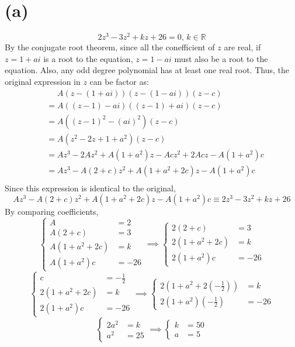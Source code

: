\documentclass[12pt,a4paper]{article}
\begin{document}
\section*{(a)}
\[2z^3-3z^2+kz+26=0,\,k\in\mathbb R\]
By the conjugate root theorem, since all the conefficient of \(z\) are real, if \(z=1+ai\) is a root to the equation, \(z=1-ai\) must also be a root to the equation. Also, any odd degree polynomial has at least one real root. Thus, the original expression in \(z\) can be factor as:
\[\begin{aligned}
	&\phantom=A(z-(1+ai))(z-(1-ai))(z-c)\\
	&=A((z-1)-ai)((z-1)+ai)(z-c)\\
	&=A\left((z-1)^2-(ai)^2\right)(z-c)\\
	&=A\left(z^2-2z+1+a^2\right)(z-c)\\
	&=Az^3-2Az^2+A\left(1+a^2\right)z-Acz^2+2Acz-A\left(1+a^2\right)c\\
	&=Az^3-A(2+c)z^2+A\left(1+a^2+2c\right)z-A\left(1+a^2\right)c\\
\end{aligned}\]
Since this expression is identical to the original,
\[Az^3-A(2+c)z^2+A\left(1+a^2+2c\right)z-A\left(1+a^2\right)c\equiv2z^3-3z^2+kz+26\]
By comparing coefficients, 
\[\begin{cases}
	A&=2\\
	A(2+c)&=3\\
	A\left(1+a^2+2c\right)&=k\\
	A\left(1+a^2\right)c&=-26
\end{cases}
\implies
\begin{cases}
    2(2+c)&=3\\
    2\left(1+a^2+2c\right)&=k\\
    2\left(1+a^2\right)c&=-26
\end{cases}\]
\[\begin{cases}
	c&=-\frac12\\
    2\left(1+a^2+2c\right)&=k\\
	2\left(1+a^2\right)c&=-26
\end{cases}
\implies
\begin{cases}
	2\left(1+a^2+2\left(-\frac12\right)\right)&=k\\
	2\left(1+a^2\right)\left(-\frac12\right)&=-26
\end{cases}\]
\[\begin{cases}
	2a^2&=k\\
	a^2&=25
\end{cases}
\implies
\boxed{\begin{cases}
    k&=50\\
    a&=5
\end{cases}}\]
\newpage
\end{document}
